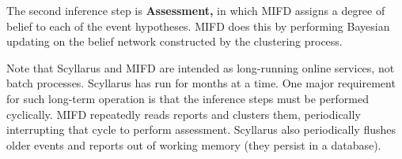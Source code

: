 The second inference step is \textbf{Assessment,} in which MIFD assigns a degree of belief
to each of the event hypotheses.
MIFD does this by performing Bayesian updating on the belief network constructed
by the clustering process. 

Note that Scyllarus and MIFD are intended as long-running online services, not batch processes.
Scyllarus has run for months at a time.
One major requirement for such long-term operation is that the
inference steps must be performed cyclically.  MIFD repeatedly reads
reports and clusters them, periodically interrupting that
cycle to perform assessment.
Scyllarus also periodically flushes older events and reports out of working
memory (they persist in a database).




